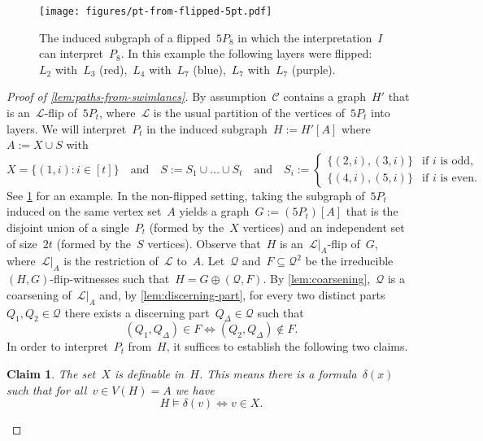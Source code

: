 \documentclass[11pt]{article}      \usepackage[margin=1in]{geometry}  \usepackage{microtype}
\newtheorem{claim}[theorem]{Claim}
\theoremstyle{definition}
\newcommand{\LL}{\mathcal{L}}
\newcommand{\CC}{\mathcal{C}}
\newcommand{\QQ}{\mathcal{Q}}
\begin{document}
\begin{figure}[htbp]
    \centering
    \texttt{[image: figures/pt-from-flipped-5pt.pdf]}    
    \caption{The induced subgraph of a flipped~$5P_8$ in which the interpretation~$I$ can interpret~$P_8$.
    In this example the following layers were flipped:~$L_2$ with~$L_3$ (red),~$L_4$ with~$L_7$ (blue),~$L_7$ with~$L_7$ (purple).
    }
    \label{fig:pt-from-flipped-5pt}
\end{figure}

\begin{proof}[Proof of \cref{lem:paths-from-swimlanes}]
    By assumption~$\CC$ contains a graph~$H'$ that is an~$\LL$-flip of~$5P_t$, where~$\LL$ is the usual partition of the vertices of~$5P_t$ into layers.
We will interpret~$P_t$ in the induced subgraph~$H := H'[A]$ where~$A := X \cup S$ with
    \[
        X = \{(1,i) : i \in [t]\} 
        \quad\text{and}\quad 
        S := S_1 \cup \dots \cup S_t
        \quad\text{and}\quad 
        S_i := 
        \begin{cases}
            \{(2,i),(3,i)\} & \text{if~$i$ is odd,}\\
            \{(4,i),(5,i)\} & \text{if~$i$ is even}. 
        \end{cases}
    \]
    See \cref{fig:pt-from-flipped-5pt} for an example.
    In the non-flipped setting, taking the subgraph of~$5P_t$ induced on the same vertex set~$A$ yields a graph~$G:=(5P_t)[A]$ that is the disjoint union of a single~$P_t$ (formed by the~$X$ vertices) and an independent set of size~$2t$ (formed by the~$S$ vertices).
    Observe that~$H$ is an~$\LL\vert_A$-flip of~$G$, where~$\LL\vert_A$ is the restriction of~$\LL$ to~$A$.
    Let~$\QQ$ and~$F \subseteq \QQ^2$ be the irreducible~$(H,G)$-flip-witnesses such that~$H = G \oplus (\QQ,F)$.
    By \cref{lem:coarsening},~$\QQ$ is a coarsening of~$\LL\vert_A$ and, by \cref{lem:discerning-part}, for every two distinct parts~$Q_1,Q_2 \in \QQ$ there exists a discerning part~$Q_\Delta \in \QQ$ such that 
    \[
        (Q_1,Q_\Delta) \in F \Leftrightarrow  (Q_2,Q_\Delta) \notin F.
    \]
    In order to interpret~$P_t$ from~$H$, it suffices to establish the following two claims.
    
    \begin{claim}\label{clm:domain}
        The set~$X$ is definable in~$H$. This means there is a formula~$\delta(x)$ such that for all~$v \in V(H) = A$ we have
        \[
          H \models \delta(v) \Leftrightarrow v \in X.  
        \]
    \end{claim}
    

\end{proof}
\end{document}

